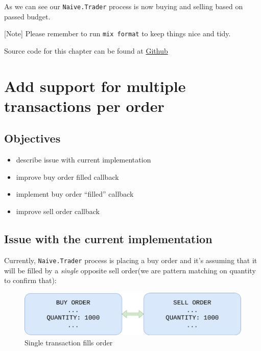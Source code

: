 \documentclass[
]{book}
\providecommand{\tightlist}{%
  \setlength{\itemsep}{0pt}\setlength{\parskip}{0pt}}
\begin{document}
As we can see our \texttt{Naive.Trader} process is now buying and selling based on passed budget.

{[}Note{]} Please remember to run \texttt{mix\ format} to keep things nice and tidy.

Source code for this chapter can be found at \href{https://github.com/frathon/create-a-cryptocurrency-trading-bot-in-elixir-source-code/tree/chapter_07}{Github}

\hypertarget{add-support-for-multiple-transactions-per-order}{%
\chapter{Add support for multiple transactions per order}\label{add-support-for-multiple-transactions-per-order}}

\hypertarget{objectives-7}{%
\section{Objectives}\label{objectives-7}}

\begin{itemize}
\tightlist
\item
  describe issue with current implementation
\item
  improve buy order filled callback
\item
  implement buy order ``filled'' callback
\item
  improve sell order callback
\end{itemize}

\hypertarget{issue-with-the-current-implementation}{%
\section{Issue with the current implementation}\label{issue-with-the-current-implementation}}

Currently, \texttt{Naive.Trader} process is placing a buy order and it's assuming that it will be filled by a \emph{single} opposite sell order(we are pattern matching on quantity to confirm that):

\begin{figure}
\centering
\includegraphics{images/chapter_08_01_single_transaction.png}
\caption{Single transaction fills order}
\end{figure}
\end{document}
